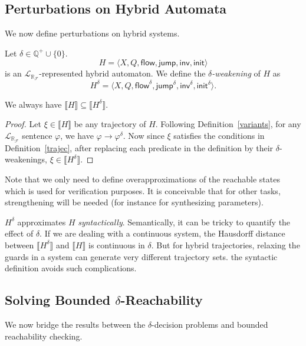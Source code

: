 \documentclass[envcountsect]{llncs}
\newcommand{\flow}{\mathsf{flow}}
\newcommand{\jump}{\mathsf{jump}}
\newcommand{\inv}{\mathsf{inv}}
\newcommand{\init}{\mathsf{init}}
\newcommand{\lrf}{\mathcal{L}_{\mathbb{R}_{\mathcal{F}}}}
\begin{document}
\subsection{Perturbations on Hybrid Automata}
We now define perturbations on hybrid systems.
\begin{definition}
Let $\delta\in\mathbb{Q}^+\cup\{0\}$. 
$$H = \langle X, Q, \flow, \jump, \inv, \init\rangle$$
is an $\lrf$-represented hybrid automaton. We define the {\em
$\delta$-weakening} of $H$ as
$$H^{\delta} = \langle X, Q, \flow^{\delta}, \jump^{\delta}, \inv^{\delta},
\init^{\delta}\rangle.$$
\end{definition}
\begin{proposition} We always have $\llbracket H\rrbracket\subseteq \llbracket
H^{\delta}\rrbracket.$
\end{proposition}
\begin{proof}
Let $\xi\in \llbracket H\rrbracket$ be any trajectory of $H$. Following
Definition~\ref{variants}, for any $\lrf$ sentence $\varphi$, we have 
$\varphi\rightarrow\varphi^{\delta}$. Now since
$\xi$ satisfies the conditions in Definition~\ref{trajec}, after replacing each
predicate in the definition by their $\delta$-weakenings, $\xi\in
\llbracket H^{\delta}\rrbracket$.
\end{proof}
\begin{remark}
Note that we only need to define overapproximations of the reachable states
which is used for verification purposes. It is conceivable that for other tasks,
strengthening will be needed (for instance for synthesizing parameters). 
\end{remark}

\begin{remark}
$H^{\delta}$ approximates $H$ {\em syntactically}. Semantically, it can be
tricky to quantify the effect of $\delta$. If we are dealing with a continuous
system, the Hausdorff distance between $\llbracket
H^{\delta}\rrbracket$ and $\llbracket H\rrbracket$ is continuous in
$\delta$. But for hybrid trajectories, relaxing the guards in a system can
generate very different trajectory sets. the syntactic
definition avoids such complications. 
\end{remark}

\subsection{Solving Bounded $\delta$-Reachability}

We now bridge the results between the $\delta$-decision problems and bounded
reachability checking. 
\end{document}
